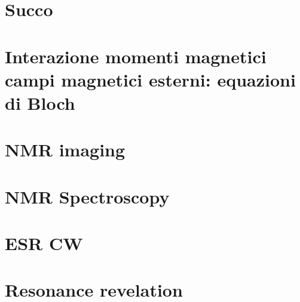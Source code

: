\documentclass[10pt,xcolor={usenames},fleqn,mathserif,serif]{beamer}
\begin{document}
\part{Succo}


\part{Interazione momenti magnetici campi magnetici esterni: equazioni di Bloch}


\part{NMR imaging}


\part{NMR Spectroscopy}


\part{ESR CW}


\part{Resonance revelation}


%
\end{document}
